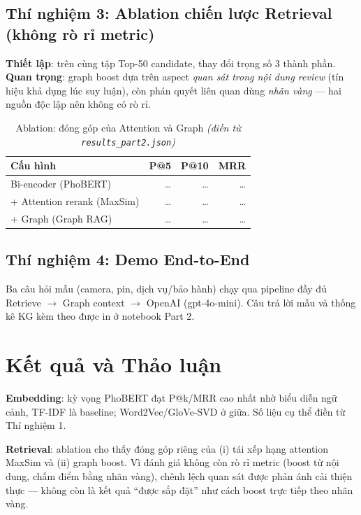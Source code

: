 \documentclass[12pt,a4paper]{article}
\begin{document}
\subsection{Thí nghiệm 3: Ablation chiến lược Retrieval (không rò rỉ metric)}

\textbf{Thiết lập}: trên cùng tập Top-50 candidate, thay đổi trọng số 3 thành phần. \textbf{Quan trọng}: graph boost dựa trên aspect \textit{quan sát trong nội dung review} (tín hiệu khả dụng lúc suy luận), còn phán quyết liên quan dùng \textit{nhãn vàng} --- hai nguồn độc lập nên không có rò rỉ.

\begin{table}[H]
\centering
\caption{Ablation: đóng góp của Attention và Graph \textit{(điền từ \texttt{results\_part2.json})}}
\begin{tabular}{lrrr}
\toprule
\textbf{Cấu hình} & \textbf{P@5} & \textbf{P@10} & \textbf{MRR} \\
\midrule
Bi-encoder (PhoBERT) & \dots & \dots & \dots \\
\quad + Attention rerank (MaxSim) & \dots & \dots & \dots \\
\quad + Graph (Graph RAG) & \dots & \dots & \dots \\
\bottomrule
\end{tabular}
\end{table}

\subsection{Thí nghiệm 4: Demo End-to-End}

Ba câu hỏi mẫu (camera, pin, dịch vụ/bảo hành) chạy qua pipeline đầy đủ Retrieve $\to$ Graph context $\to$ OpenAI (gpt-4o-mini). Câu trả lời mẫu và thống kê KG kèm theo được in ở notebook Part 2.

\section{Kết quả và Thảo luận}

\textbf{Embedding}: kỳ vọng PhoBERT đạt P@k/MRR cao nhất nhờ biểu diễn ngữ cảnh, TF-IDF là baseline; Word2Vec/GloVe-SVD ở giữa. Số liệu cụ thể điền từ Thí nghiệm 1.

\textbf{Retrieval}: ablation cho thấy đóng góp riêng của (i) tái xếp hạng attention MaxSim và (ii) graph boost. Vì đánh giá không còn rò rỉ metric (boost từ nội dung, chấm điểm bằng nhãn vàng), chênh lệch quan sát được phản ánh cải thiện thực --- không còn là kết quả ``được sắp đặt'' như cách boost trực tiếp theo nhãn vàng.
\end{document}
